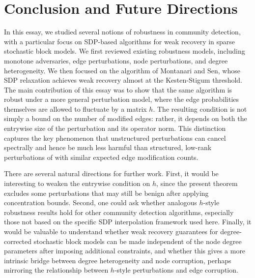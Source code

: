 \documentclass[11pt, titlepage]{article} %
\numberwithin{equation}{section}
\theoremstyle{definition}
\numberwithin{theorem}{section}
\numberwithin{lemma}{section}
\numberwithin{corollary}{section}
\numberwithin{proposition}{section}
\numberwithin{definition}{section}
\numberwithin{remark}{section}
\begin{document}
\section{Conclusion and Future Directions}
\label{sec:conclusion}
In this essay, we studied several notions of robustness in community detection, with a particular
focus on SDP-based algorithms for weak recovery in sparse stochastic block models. We first reviewed
existing robustness models, including monotone adversaries, edge perturbations, node perturbations,
and degree heterogeneity. We then focused on the algorithm of Montanari and Sen, whose SDP relaxation
achieves weak recovery almost at the Kesten-Stigum threshold. The main contribution of this essay was
to show that the same algorithm is robust under a more general perturbation model, where the edge
probabilities themselves are allowed to fluctuate by a matrix $h$. The resulting condition is not
simply a bound on the number of modified edges: rather, it depends on both the entrywise size of the
perturbation and its operator norm. This distinction captures the key phenomenon that unstructured
perturbations can cancel spectrally and hence be much less harmful than structured, low-rank
perturbations of with similar expected edge modification counts.

There are several natural directions for further work. First, it would be interesting to weaken the
entrywise condition on $h$, since the present theorem excludes some perturbations that may still
be benign after applying concentration bounds. Second, one could ask whether analogous $h$-style
robustness results hold for other community detection algorithms, especially those not based on the
specific SDP interpolation framework used here. Finally, it would be valuable to understand whether
weak recovery guarantees for degree-corrected stochastic block models can be made independent of the
node degree parameters after imposing additional constraints, and whether this gives a more intrinsic 
bridge between degree heterogeneity and node corruption, perhaps mirroring the relationship between
$h$-style perturbations and edge corruption.

%                                                                             
%                                                                             



\newpage


\end{document}

